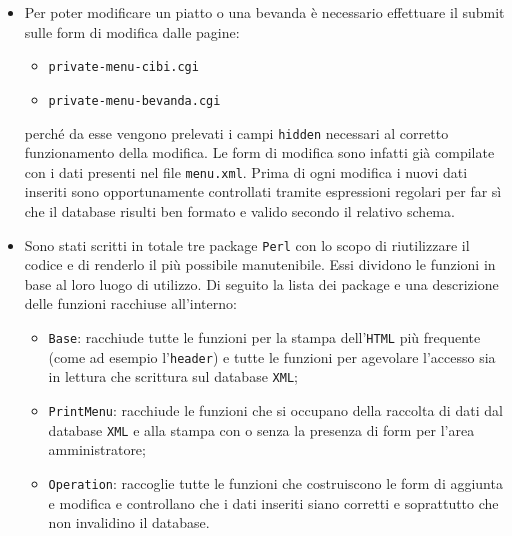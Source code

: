 \documentclass[../relazione.tex]{subfiles}
\begin{document}
\begin{itemize}
		\item Per poter modificare un piatto o una bevanda è necessario effettuare il submit sulle form di modifica dalle pagine:
			\begin{itemize}
				\item \texttt{private-menu-cibi.cgi}
				\item \texttt{private-menu-bevanda.cgi}
			\end{itemize}
			perché da esse vengono prelevati i campi \texttt{hidden} necessari al corretto funzionamento della modifica. Le form di modifica sono infatti già compilate con i dati presenti nel file \texttt{menu.xml}. Prima di ogni modifica i nuovi dati inseriti sono opportunamente controllati tramite espressioni regolari per far sì che il database risulti ben formato e valido secondo il relativo schema.
		\item Sono stati scritti in totale tre package \texttt{Perl} con lo scopo di riutilizzare il codice e di renderlo il più possibile manutenibile. Essi dividono le funzioni in base al loro luogo di utilizzo. Di seguito la lista dei package e una descrizione delle funzioni racchiuse all'interno:
			\begin{itemize}
				\item \texttt{Base}: racchiude tutte le funzioni per la stampa dell'\texttt{HTML} più frequente (come ad esempio l'\texttt{header}) e tutte le funzioni per agevolare l'accesso sia in lettura che scrittura sul database \texttt{XML};
				\item \texttt{PrintMenu}: racchiude le funzioni che si occupano della raccolta di dati dal database \texttt{XML} e alla stampa con o senza la presenza di form per l'area amministratore;
				\item \texttt{Operation}: raccoglie tutte le funzioni che costruiscono le form di aggiunta e modifica e controllano che i dati inseriti siano corretti e soprattutto che non invalidino il database.
			\end{itemize}
	\end{itemize}
\end{document}
